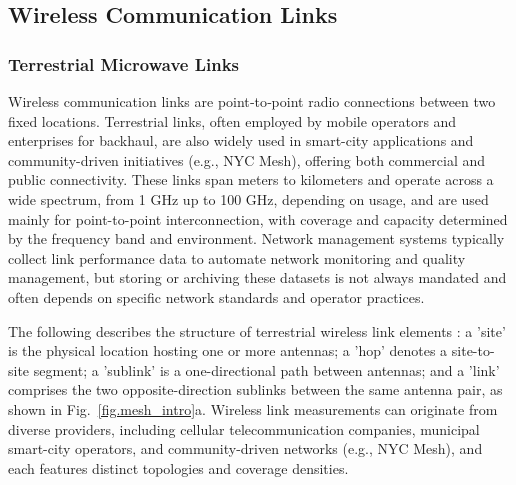 \documentclass[manuscript]{copernicus}
\begin{document}

\subsection{Wireless Communication Links}\label{sec:wireless_links}
\subsubsection{Terrestrial Microwave Links}\label{sec:microwave_mmwave_overview}
Wireless communication links are point‑to‑point radio connections between two fixed locations.
Terrestrial links, often employed by mobile operators and enterprises for backhaul, are also widely used in smart-city applications and community-driven initiatives (e.g., NYC Mesh), offering both commercial and public connectivity.
These links span meters to kilometers and operate across a wide spectrum, from 1 GHz up to 100 GHz, depending on usage, and are used mainly for point-to-point interconnection, with coverage and capacity determined by the frequency band and environment.
Network management systems typically collect link performance data to automate network monitoring and quality management, but storing or archiving these datasets is not always mandated and often depends on specific network standards and operator practices.

The following describes the structure of terrestrial wireless link elements \citep{fencl2023data}: a 'site' is the physical location hosting one or more antennas; a 'hop' denotes a site-to-site segment; a 'sublink' is a one-directional path between antennas; and a 'link' comprises the two opposite-direction sublinks between the same antenna pair, as shown in Fig.~\ref{fig.mesh_intro}a.
Wireless link measurements can originate from diverse providers, including cellular telecommunication companies, municipal smart-city operators, and community-driven networks (e.g., NYC Mesh), and each features distinct topologies and coverage densities. 
\end{document}
